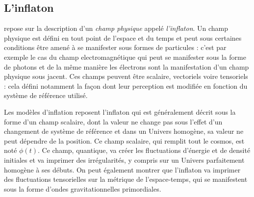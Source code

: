 \subsection{L'inflaton}
 repose sur la description d'un \textit{champ physique} appelé \textit{l'inflaton}. Un champ physique est défini en tout point de l'espace et du temps et peut sous certaines conditions être amené à se manifester sous formes de particules : c'est par exemple le cas du champ electromagnétique qui peut se manifester sous la forme de photons et de la même manière les électrons sont la manifestation d'un champ physique sous jacent. Ces champs peuvent être scalaire, vectoriels voire tensoriels : cela défini notamment la façon dont leur perception est modifiée en fonction du système de référence utilisé.

Les modèles d'inflation reposent l'inflaton qui est généralement décrit sous la forme d'un champ scalaire, dont la valeur ne change pas sous l'effet d'un changement de système de référence et dans un Univers homogène, sa valeur ne peut dépendre de la position. Ce champ scalaire, qui remplit tout le cosmos, est noté $\phi(t)$. Ce champ, quantique, va créer les fluctuations d'énergie et de densité initiales et va imprimer des irrégularités, y compris sur un Univers parfaitement homogène à ses débuts. On peut également montrer que l'inflaton va imprimer des fluctuations tensorielles sur la métrique de l'espace-temps, qui se manifestent sous la forme d'ondes gravitationnelles primordiales.

